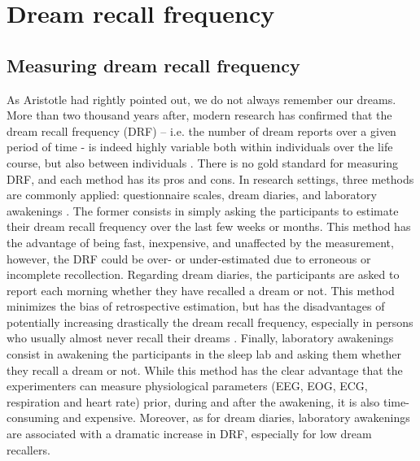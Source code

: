 %
\chapter{Dream recall frequency}
\label{sec:dream-recall}


\section{Measuring dream recall frequency}
\label{sec:dream-recall:method}

As Aristotle had rightly pointed out, we do not always remember our dreams. More than two thousand years after, modern research has confirmed that the dream recall frequency (DRF) – i.e. the number of dream reports over a given period of time -  is indeed highly variable both within individuals over the life course, but also between individuals \citep{schredl_factors_2003, ruby_experimental_2011}.
There is no gold standard for measuring DRF, and each method has its pros and cons. In research settings, three methods are commonly applied: questionnaire scales, dream diaries, and laboratory awakenings \citep{schredl_dream_1999}. The former consists in simply asking the participants to estimate their dream recall frequency over the last few weeks or months. This method has the advantage of being fast, inexpensive, and unaffected by the measurement, however, the DRF could be over- or under-estimated due to erroneous or incomplete recollection. Regarding dream diaries, the participants are asked to report each morning whether they have recalled a dream or not. This method minimizes the bias of retrospective estimation, but has the disadvantages of potentially increasing drastically the dream recall frequency, especially in persons who usually almost never recall their dreams \citep{schredl_questionnaires_2002}. Finally, laboratory awakenings consist in awakening the participants in the sleep lab and asking them whether they recall a dream or not. While this method has the clear advantage that the experimenters can measure physiological parameters (EEG, EOG, ECG, respiration and heart rate) prior, during and after the awakening, it is also time-consuming and expensive. Moreover, as for dream diaries, laboratory awakenings are associated with a dramatic increase in DRF, especially for low dream recallers.

